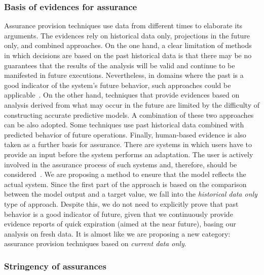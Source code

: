 \subsubsection{Basis of evidences for assurance}

Assurance provision techniques use data from different times to elaborate its arguments. The evidences rely on historical data only, projections in the future only, and combined approaches. On the one hand, a clear limitation of methods in which decisions are based on the past historical data is that there may be no guarantees that the results of the analysis will be valid and continue to be manifested in future executions. Nevertheless, in domains where the past is a good indicator of the system’s future behavior, such approaches could be applicable~\cite{Weyns2016PerpetualAF}. On the other hand, techniques that provide evidences based on analysis derived from what may occur in the future are limited by the difficulty of constructing accurate predictive models. A combination of these two approaches can be also adopted. Some techniques use past historical data combined with predicted behavior of future operations. Finally, human-based evidence is also taken as a further basis for assurance. There are systems in which users have to provide an input before the system performs an adaptation. The user is actively involved in the assurance process of such systems and, therefore, should be considered~\cite{Weyns2016PerpetualAF}. We are proposing a method to ensure that the model reflects the actual system. Since the first part of the approach is based on the comparison between the model output and a target value, we fall into the \textit{historical data only} type of approach. Despite this, we do not need to explicitly prove that past behavior is a good indicator of future, given that we continuously provide evidence reports of quick expiration (aimed at the near future), basing our analysis on fresh data. It is almost like we are proposing a new category: assurance provision techniques based on \textit{current data only}.

\subsubsection{Stringency of assurances} 

